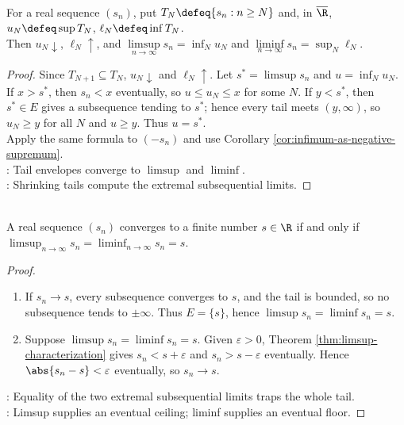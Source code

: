 \begin{proposition} \label{prop:limsup-liminf-tail-suprema} \\
For a real sequence $(s_n)$, put $T_N\defeq\{s_n:n\geq N\}$ and, in $\overline{\R}$, $u_N\defeq\sup T_N$, $\ell_N\defeq\inf T_N$.\\
Then $u_N\downarrow$, $\ell_N\uparrow$, and $\limsup\limits_{n\to\infty}s_n=\inf_Nu_N$ and $\liminf\limits_{n\to\infty}s_n=\sup_N\ell_N$.
\begin{proof}
Since $T_{N+1}\subseteq T_N$, $u_N\downarrow$ and $\ell_N\uparrow$. Let $s^*=\limsup s_n$ and $u=\inf_Nu_N$.\\
If $x>s^*$, then $s_n<x$ eventually, so $u\leq u_N\leq x$ for some $N$. If $y<s^*$, then $s^*\in E$ gives a subsequence tending to $s^*$; hence every tail meets $(y,\infty)$, so $u_N\geq y$ for all $N$ and $u\geq y$. Thus $u=s^*$.\\
Apply the same formula to $(-s_n)$ and use Corollary \ref{cor:infimum-as-negative-supremum}.\\
: Tail envelopes converge to $\limsup$ and $\liminf$.\\
: Shrinking tails compute the extremal subsequential limits.
\end{proof}
\end{proposition}

\begin{theorem} \label{thm:convergence-iff-limsup-liminf-equal} \\
A real sequence $(s_n)$ converges to a finite number $s\in\R$ if and only if $\limsup_{n\to\infty}s_n=\liminf_{n\to\infty}s_n=s$.
\begin{proof}
\begin{enumerate}[label=\roman*.]
\setlength{\itemsep}{0pt}
\item[$(\Rightarrow)$] If $s_n\to s$, every subsequence converges to $s$, and the tail is bounded, so no subsequence tends to $\pm\infty$. Thus $E=\{s\}$, hence $\limsup s_n=\liminf s_n=s$.
\item[$(\Leftarrow)$] Suppose $\limsup s_n=\liminf s_n=s$. Given $\varepsilon>0$, Theorem \ref{thm:limsup-characterization} gives $s_n<s+\varepsilon$ and $s_n>s-\varepsilon$ eventually. Hence $\abs{s_n-s}<\varepsilon$ eventually, so $s_n\to s$.
\end{enumerate}
: Equality of the two extremal subsequential limits traps the whole tail.\\
: Limsup supplies an eventual ceiling; liminf supplies an eventual floor.
\end{proof}
\end{theorem}

